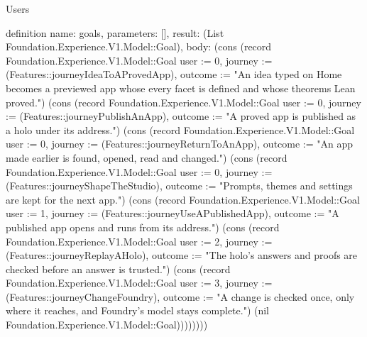 \begin{lexlean}{Users}
\begin{semanticmodule}
definition{
  name: goals,
  parameters: [],
  result: (List Foundation.Experience.V1.Model::Goal),
  body: (cons (record Foundation.Experience.V1.Model::Goal {user := 0, journey := (Features::journeyIdeaToAProvedApp), outcome := "An idea typed on Home becomes a previewed app whose every facet is defined and whose theorems Lean proved."}) (cons (record Foundation.Experience.V1.Model::Goal {user := 0, journey := (Features::journeyPublishAnApp), outcome := "A proved app is published as a holo under its address."}) (cons (record Foundation.Experience.V1.Model::Goal {user := 0, journey := (Features::journeyReturnToAnApp), outcome := "An app made earlier is found, opened, read and changed."}) (cons (record Foundation.Experience.V1.Model::Goal {user := 0, journey := (Features::journeyShapeTheStudio), outcome := "Prompts, themes and settings are kept for the next app."}) (cons (record Foundation.Experience.V1.Model::Goal {user := 1, journey := (Features::journeyUseAPublishedApp), outcome := "A published app opens and runs from its address."}) (cons (record Foundation.Experience.V1.Model::Goal {user := 2, journey := (Features::journeyReplayAHolo), outcome := "The holo's answers and proofs are checked before an answer is trusted."}) (cons (record Foundation.Experience.V1.Model::Goal {user := 3, journey := (Features::journeyChangeFoundry), outcome := "A change is checked once, only where it reaches, and Foundry's model stays complete."}) (nil Foundation.Experience.V1.Model::Goal))))))))
}


\end{semanticmodule}
\end{lexlean}
